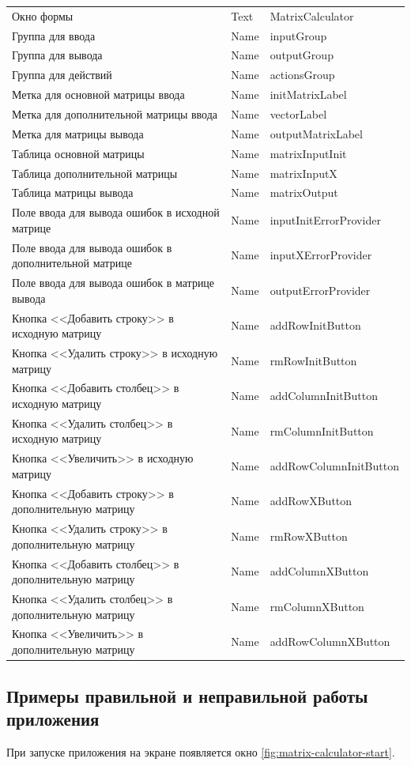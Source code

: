 \begin{xltabular}{\textwidth}{| m{0.3\textwidth} | m{0.3\textwidth} | m{0.3\textwidth} |}
Окно формы & Text & MatrixCalculator \\
Группа для ввода & Name & inputGroup \\
Группа для вывода & Name & outputGroup \\
Группа для действий & Name & actionsGroup \\
Метка для основной матрицы ввода & Name & initMatrixLabel \\
Метка для дополнительной матрицы ввода & Name & vectorLabel \\
Метка для матрицы вывода & Name & outputMatrixLabel \\
Таблица основной матрицы & Name & matrixInputInit \\
Таблица дополнительной матрицы & Name & matrixInputX \\
Таблица матрицы вывода & Name & matrixOutput \\
Поле ввода для вывода ошибок в исходной матрице & Name & inputInitErrorProvider \\
Поле ввода для вывода ошибок в дополнительной матрице & Name & inputXErrorProvider \\
Поле ввода для вывода ошибок в матрице вывода & Name & outputErrorProvider \\
Кнопка <<Добавить строку>> в исходную матрицу & Name & addRowInitButton \\
Кнопка <<Удалить строку>> в исходную матрицу & Name & rmRowInitButton \\
Кнопка <<Добавить столбец>> в исходную матрицу & Name & addColumnInitButton \\
Кнопка <<Удалить столбец>> в исходную матрицу & Name & rmColumnInitButton \\
Кнопка <<Увеличить>> в исходную матрицу & Name & addRowColumnInitButton \\
Кнопка <<Добавить строку>> в дополнительную матрицу & Name & addRowXButton \\
Кнопка <<Удалить строку>> в дополнительную матрицу & Name & rmRowXButton \\
Кнопка <<Добавить столбец>> в дополнительную матрицу & Name & addColumnXButton \\
Кнопка <<Удалить столбец>> в дополнительную матрицу & Name & rmColumnXButton \\
Кнопка <<Увеличить>> в дополнительную матрицу & Name & addRowColumnXButton \\
\end{xltabular}


\subsection{Примеры правильной и неправильной работы приложения}
При запуске приложения на экране появляется окно \ref{fig:matrix-calculator-start}.

